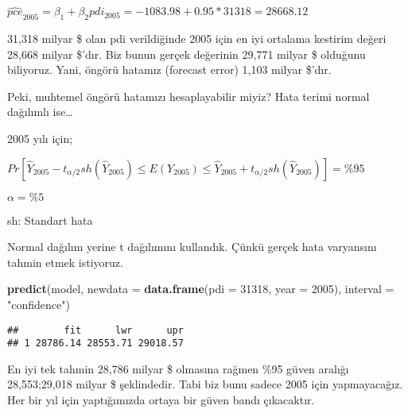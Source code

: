\documentclass[
]{book}
\newenvironment{Shaded}{\begin{snugshade}}{\end{snugshade}}
\newcommand{\DataTypeTok}[1]{\textcolor[rgb]{0.13,0.29,0.53}{#1}}
\newcommand{\DecValTok}[1]{\textcolor[rgb]{0.00,0.00,0.81}{#1}}
\newcommand{\KeywordTok}[1]{\textcolor[rgb]{0.13,0.29,0.53}{\textbf{#1}}}
\newcommand{\NormalTok}[1]{#1}
\newcommand{\OperatorTok}[1]{\textcolor[rgb]{0.81,0.36,0.00}{\textbf{#1}}}
\newcommand{\StringTok}[1]{\textcolor[rgb]{0.31,0.60,0.02}{#1}}
\begin{document}
\(\hat{pce}_{2005} = \beta_1 + \beta_2pdi_{2005} = -1083.98 + 0.95*31318 = 28668.12\)

31,318 milyar \$ olan pdi verildiğinde 2005 için en iyi ortalama kestirim değeri 28,668 milyar \$'dır. Biz bunun gerçek değerinin 29,771 milyar \$ olduğunu biliyoruz. Yani, öngörü hatamız (forecast error) 1,103 milyar \$'dır.

Peki, muhtemel öngörü hatamızı hesaplayabilir miyiz? Hata terimi normal dağılımlı ise\ldots{}

2005 yılı için;

\(Pr[\hat{Y}_{2005} - t_{\alpha/2}sh(\hat{Y}_{2005}) \le E(Y_{2005}) \le \hat{Y}_{2005} + t_{\alpha/2}sh(\hat{Y}_{2005})] = \%95\)

\(\alpha = \%5\)

sh: Standart hata

Normal dağılım yerine t dağılımını kullandık. Çünkü gerçek hata varyansını tahmin etmek istiyoruz.

\begin{Shaded}
\begin{Highlighting}[]
\KeywordTok{predict}\NormalTok{(model, }\DataTypeTok{newdata =} \KeywordTok{data.frame}\NormalTok{(}\DataTypeTok{pdi =} \DecValTok{31318}\NormalTok{, }\DataTypeTok{year =} \DecValTok{2005}\NormalTok{), }\DataTypeTok{interval =} \StringTok{"confidence"}\NormalTok{)}
\end{Highlighting}
\end{Shaded}

\begin{verbatim}
##        fit      lwr      upr
## 1 28786.14 28553.71 29018.57
\end{verbatim}

En iyi tek tahmin 28,786 milyar \$ olmasına rağmen \%95 güven aralığı 28,553;29,018 milyar \$ şeklindedir. Tabi biz bunu sadece 2005 için yapmayacağız. Her bir yıl için yaptığımızda ortaya bir güven bandı çıkacaktır.

\begin{Shaded}
\end{Shaded}
\end{document}
